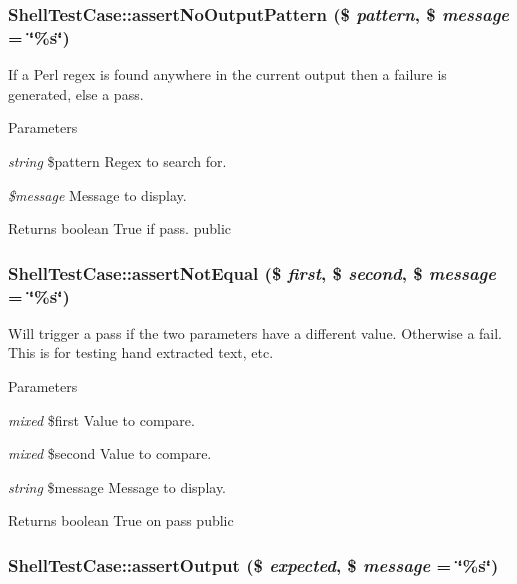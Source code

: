 \hypertarget{class_shell_test_case_ac00b2d0b2f8a37998e2ffbe16ea286e4}{
\subsubsection[{assertNoOutputPattern}]{\setlength{\rightskip}{0pt plus 5cm}ShellTestCase::assertNoOutputPattern (\$ {\em pattern}, \/  \$ {\em message} = {\ttfamily \char`\"{}\%s\char`\"{}})}}
\label{class_shell_test_case_ac00b2d0b2f8a37998e2ffbe16ea286e4}
If a Perl regex is found anywhere in the current output then a failure is generated, else a pass. 
\begin{DoxyParams}{Parameters}
\item[{\em string}]\$pattern Regex to search for. \item[{\em \$message}]Message to display. \end{DoxyParams}
\begin{DoxyReturn}{Returns}
boolean True if pass.  public 
\end{DoxyReturn}
\hypertarget{class_shell_test_case_a37aa31741b2d5fc1aac150efa0339bbf}{
\subsubsection[{assertNotEqual}]{\setlength{\rightskip}{0pt plus 5cm}ShellTestCase::assertNotEqual (\$ {\em first}, \/  \$ {\em second}, \/  \$ {\em message} = {\ttfamily \char`\"{}\%s\char`\"{}})}}
\label{class_shell_test_case_a37aa31741b2d5fc1aac150efa0339bbf}
Will trigger a pass if the two parameters have a different value. Otherwise a fail. This is for testing hand extracted text, etc. 
\begin{DoxyParams}{Parameters}
\item[{\em mixed}]\$first Value to compare. \item[{\em mixed}]\$second Value to compare. \item[{\em string}]\$message Message to display. \end{DoxyParams}
\begin{DoxyReturn}{Returns}
boolean True on pass  public 
\end{DoxyReturn}
\hypertarget{class_shell_test_case_a9961443a5439f183fad382d7a814ed61}{
\subsubsection[{assertOutput}]{\setlength{\rightskip}{0pt plus 5cm}ShellTestCase::assertOutput (\$ {\em expected}, \/  \$ {\em message} = {\ttfamily \char`\"{}\%s\char`\"{}})}}
